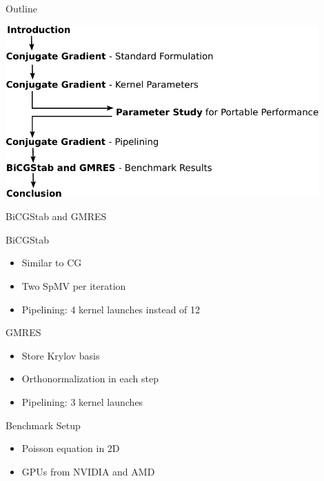 


\begin{frame}{Outline}
 \begin{center}
  \includegraphics[width=0.9\textwidth]{figures/outline-crop}
 \end{center}
\end{frame}


\begin{frame}[fragile]{BiCGStab and GMRES}
 \begin{block}{BiCGStab}
 \begin{itemize}
  \item Similar to CG
  \item Two SpMV per iteration
  \item Pipelining: 4 kernel launches instead of 12
 \end{itemize}
 \end{block}   
 
 \begin{block}{GMRES}
 \begin{itemize}
  \item Store Krylov basis
  \item Orthonormalization in each step
  \item Pipelining: 3 kernel launches
 \end{itemize}
 \end{block}   

 \begin{block}{Benchmark Setup}
 \begin{itemize}
  \item Poisson equation in 2D
  \item GPUs from NVIDIA and AMD
 \end{itemize}
 \end{block}   

\end{frame}



